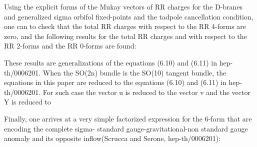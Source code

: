 \documentclass[a4paper,a4paper]{article}
\begin{document}
Using the explicit forms of the Mukay vectors of RR charges for the D-branes and generalized sigma orbifol fixed-points and the tadpole cancellation condition, one can to check that the total RR charges  \coordHE{} with respect to the RR 4-forms are zero, and the following results for the total
RR charges \coordHE{} and \coordHE{} with respect to the RR 2-forms and the RR 0-forms are found:

\begin{center}
{  \coordHE{} }
\end{center}  
\begin{center}
\setlength{\baselineskip}{30pt} 
{  \coordHE{} }
\end{center}

These results are generalizations of the equations (6.10) and (6.11) in hep-th/0006201.  When the SO(2n) bundle is the SO(10) tangent bundle, the equations in this paper are reduced to the equations (6.10) and (6.11) in hep-th/0006201.  For such case the vector u is reduced to the vector v and the vector Y is reduced to \coordHE{}

Finally, one arrives at a very simple factorized expression for the 6-form that are encoding the complete sigma- standard gauge-gravitational-non standard gauge anomaly and its opposite inflow(Scrucca and Serone, hep-th/0006201):

\begin{center}
{  \coordHE{} }
\end{center}
\end{document}
